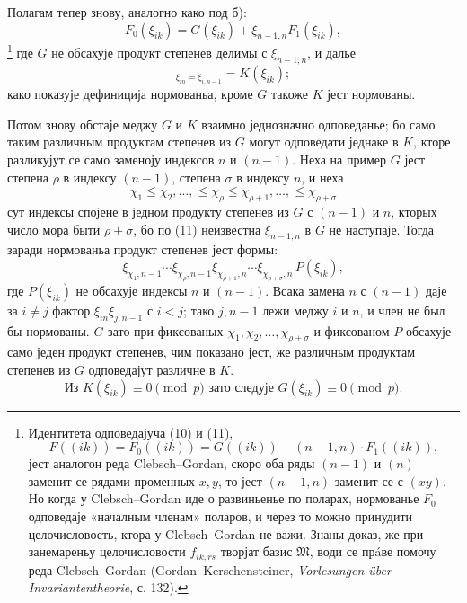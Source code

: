 ﻿\documentclass[11pt]{article}
\providecommand{\frM}{\mathfrak M}
\begin{document}
Полагам тепер знову, аналогно како под б):
\begin{equation}
        F_0(\xi_{ik})=G(\xi_{ik})+\xi_{n-1,n}F_1(\xi_{ik}),
\end{equation}
\footnote{Идентитета одповедајуча (10) и (11),
        \[
          F((ik))=F_0((ik))=G((ik))+(n-1,n)\cdot F_1((ik)),
        \]
        јест аналогон реда Clebsch--Gordan, скоро оба ряды \((n-1)\) и \((n)\) заменит се рядами променных \(x,y\), то јест \((n-1,n)\) заменит се с \((xy)\). Но когда у Clebsch--Gordan иде о развиньенье по поларах, нормованье \(F_0\) одповедаје «началным членам» поларов, и через то можно принудити целочисловость, ктора у Clebsch--Gordan не важи. Знаны доказ, же при занемареньу целочисловости \(f_{ik,rs}\) творјат базис \(\frM\), води се прáве помочу реда Clebsch--Gordan (Gordan--Kerschensteiner, \emph{Vorlesungen über Invariantentheorie}, с. 132).}
где \(G\) не обсахује продукт степенев делимы с \(\xi_{n-1,n}\), и далье
\begin{equation}
        [G]_{\xi_{in}=\xi_{i,n-1}}=K(\xi_{ik});
\end{equation}
како показује дефиниција нормованьа, кроме \(G\) такоже \(K\) јест нормованы.

Потом знову обстаје меджу \(G\) и \(K\) взаимно једнозначно одповеданье; бо само таким различным продуктам степенев из \(G\) могут одповедати једнаке в \(K\), кторе разликујут се само заменоју индексов \(n\) и \((n-1)\). Неха на пример \(G\) јест степена \(\rho\) в индексу \((n-1)\), степена \(\sigma\) в индексу \(n\), и неха
\[
        \chi_1\le\chi_2,\ldots,\le\chi_\rho\le\chi_{\rho+1},\ldots,\le\chi_{\rho+\sigma}
\]
сут индексы спојене в једном продукту степенев из \(G\) с \((n-1)\) и \(n\), кторых число мора быти \(\rho+\sigma\), бо по (11) неизвестна \(\xi_{n-1,n}\) в \(G\) не наступаје. Тогда заради нормованьа продукт степенев јест формы:
\[
        \xi_{\chi_1,n-1}\cdots\xi_{\chi_\rho,n-1}
        \xi_{\chi_{\rho+1},n}\cdots\xi_{\chi_{\rho+\sigma},n}\,P(\xi_{ik}),
\]
где \(P(\xi_{ik})\) не обсахује индексы \(n\) и \((n-1)\). Всака замена \(n\) с \((n-1)\) даје за \(i\ne j\) фактор \(\xi_{in}\xi_{j,n-1}\) с \(i<j\); тако \(j,n-1\) лежи меджу \(i\) и \(n\), и член не был бы нормованы. \(G\) зато при фиксованых \(\chi_1,\chi_2,\ldots,\chi_{\rho+\sigma}\) и фиксованом \(P\) обсахује само једен продукт степенев, чим показано јест, же различным продуктам степенев из \(G\) одповедајут различне в \(K\).
\begin{equation}
        \text{Из }K(\xi_{ik})\equiv0\pmod p\text{ зато следује }G(\xi_{ik})\equiv0\pmod p.
\end{equation}
\end{document}
